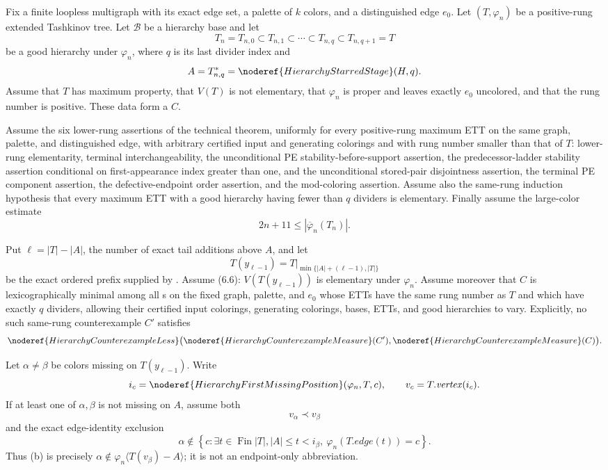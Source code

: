 \begin{lemma}
Fix a finite loopless multigraph with its exact edge set, a palette of
$k$ colors, and a distinguished edge $e_0$.  Let $(T,\varphi_n)$ be a
positive-rung extended Tashkinov tree.  Let $\mathcal B$ be a hierarchy
base and let
\[
 T_n=T_{n,0}\subset T_{n,1}\subset\cdots\subset
 T_{n,q}\subset T_{n,q+1}=T
\]
be a good hierarchy under $\varphi_n$, where $q$ is its last divider
index and
\[
 A=T_{n,q}^{*}=\noderef{HierarchyStarredStage}(H,q).
\]
Assume that $T$ has maximum property, that $V(T)$ is not elementary,
that $\varphi_n$ is proper and leaves exactly $e_0$ uncolored, and that
the rung number is positive.  These data form a
 $C$.

Assume the six lower-rung assertions of the technical theorem, uniformly
for every positive-rung maximum ETT on the same graph, palette, and
distinguished edge, with arbitrary certified input and generating
colorings and with rung number smaller than that of $T$: lower-rung
elementarity, terminal interchangeability, the unconditional PE stability-before-support assertion, the predecessor-ladder
stability assertion conditional on first-appearance index greater than one,
and the unconditional stored-pair disjointness assertion, the terminal PE component assertion, the
defective-endpoint order assertion, and the mod-coloring assertion.
Assume also the same-rung induction hypothesis that every maximum ETT
with a good hierarchy having fewer than $q$ dividers is elementary.
Finally assume the large-color estimate
\[
 2n+11\leq |\overline\varphi_n(T_n)|.
\]

Put $\ell=|T|-|A|$, the number of exact tail additions above $A$, and let
\[
 T(y_{\ell-1})=T\big|_{\min\{|A|+(\ell-1),|T|\}}
\]
be the exact ordered prefix supplied by .
Assume (6.6): $V(T(y_{\ell-1}))$ is elementary under $\varphi_n$.
Assume moreover that $C$ is lexicographically minimal among all
s on the fixed graph, palette, and
$e_0$ whose ETTs have the same rung number as $T$ and which have exactly
$q$ dividers, allowing their certified input colorings, generating
colorings, bases, ETTs, and good hierarchies to vary.  Explicitly, no
such same-rung counterexample $C'$ satisfies
\[
 \noderef{HierarchyCounterexampleLess}
  \bigl(\noderef{HierarchyCounterexampleMeasure}(C'),
        \noderef{HierarchyCounterexampleMeasure}(C)\bigr).
\]

Let $\alpha\ne\beta$ be colors missing on $T(y_{\ell-1})$.  Write
\[
 i_c=\noderef{HierarchyFirstMissingPosition}(\varphi_n,T,c),
 \qquad v_c=T.\mathit{vertex}(i_c).
\]
If at least one of $\alpha,\beta$ is not missing on $A$, assume both
\[
 v_\alpha\prec v_\beta                                      \tag{a}
\]
and the exact edge-identity exclusion
\[
 \alpha\notin
 \left\{c:\exists t\in\operatorname{Fin}|T|,
       |A|\leq t<i_\beta,
       \ \varphi_n(T.\mathit{edge}(t))=c\right\}.             \tag{b}
\]
Thus (b) is precisely
$\alpha\notin\varphi_n\langle T(v_\beta)-A\rangle$; it is not
an endpoint-only abbreviation.


\end{lemma}
